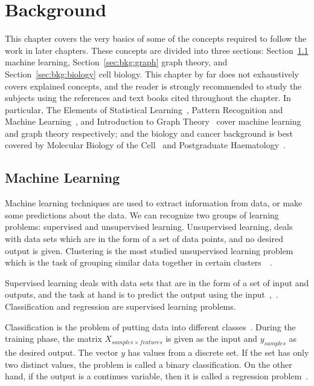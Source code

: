 \chapter{Background}
\label{sec:background}

This chapter covers the very basics of some of the concepts required to follow the work in later chapters. These concepts are divided into three sections: Section~\ref{sec:bkg:ml} machine learning, Section~\ref{sec:bkg:graph} graph theory, and Section~\ref{sec:bkg:biology} cell biology. This chapter by far does not exhaustively covers explained concepts, and the reader is strongly recommended to study the subjects using the references and text books cited throughout the chapter. In particular, The Elements of Statistical Learning~\cite{statistical-learning}, Pattern Recognition and Machine Learning~\cite{bishop2006pattern}, and Introduction to Graph Theory~\cite{west2001introduction} cover machine learning and graph theory respectively; and the biology and cancer background is best covered by Molecular Biology of the Cell~\cite{the-cell} and Postgraduate Haematology~\cite{hoffbrand2016postgraduate}.

\section{Machine Learning}
\label{sec:bkg:ml}
Machine learning techniques are used to extract information from data, or make some predictions about the data. We can recognize two groups of learning problems: supervised and unsupervised learning. Unsupervised learning, deals with data sets which are in the form of a set of data points, and no desired output is given. Clustering is the most studied unsupervised learning problem which is the task of grouping similar data together in certain clusters~\cite[Ch. 14]{statistical-learning}~\cite[Ch. 1]{murphy2012machine}.

Supervised learning deals with data sets that are in the form of a set of input and outputs, and the task at hand is to predict the output using the input~\cite[Ch. 2]{statistical-learning},~\cite[Ch. 1]{murphy2012machine}. Classification and regression are supervised learning problems. 

Classification is the problem of putting data into different classes~\cite[Ch. 1]{statistical-learning}. During the training phase, the matrix $X_{samples \times features}$ is given as the input and $y_{samples}$ as the desired output. The vector $y$ has values from a discrete set. If the set has only two distinct values, the problem is called a binary classification. On the other hand, if the output is a continues variable, then it is called a regression problem~\cite[Ch. 1]{statistical-learning}.

